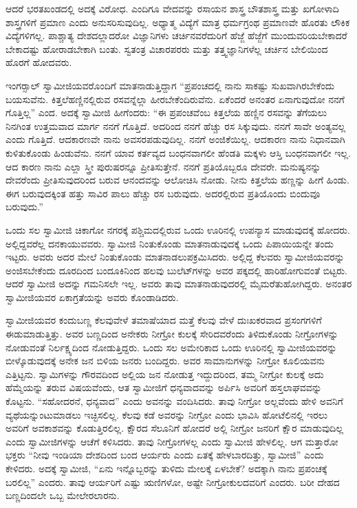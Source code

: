  ಆದರೆ ಭರತಖಂಡದಲ್ಲಿ ಅದಕ್ಕೆ ವಿರೋಧ. ಎಂದಿಗೂ ವೇದವನ್ನು ರಸಾಯನ ಶಾಸ್ತ್ರ ಬೌತಶಾಸ್ತ್ರ ಮತ್ತು ಖಗೋಳಾದಿ ಶಾಸ್ತ್ರಗಳಿಗೆ ಪ್ರಮಾಣ ಎಂದು ಅನುಸರಿಸುವುದಿಲ್ಲ. ಅಧ್ಯಾತ್ಮ ವಿದ್ಯೆಗೆ ಮಾತ್ರ ಧರ್ಮಗ್ರಂಥ ಪ್ರಮಾಣವೇ ಹೊರತು ಲೌಕಿಕ ವಿದ್ಯೆಗಳಿಗಲ್ಲ. ಪಾಶ್ಚಾತ್ಯ ದೇಶದಲ್ಲಾದರೋ ವಿಜ್ಞಾನಿಗಳು ಚರ್ಚಿನವರೆದುರಿಗೆ ಹೆಜ್ಜೆ ಹೆಜ್ಜೆಗೆ ಮುಂದುವರಿಯಬೇಕಾದರೆ ಬೇಕಾದಷ್ಟು ಹೋರಾಡಬೇಕಾಗಿ ಬಂತು. ಸ್ವತಂತ್ರ ವಿಚಾರಪರರು ಮತ್ತು ತತ್ತ್ವಜ್ಞಾನಿಗಳೆಲ್ಲ ಚರ್ಚಿನ ಬೇಲಿಯಿಂದ ಹೊರಗೆ ಹೋದವರು. 

 ಇಂಗರ್‍ಸಾಲ್ ಸ್ವಾಮೀಜಿಯವರೊಂದಿಗೆ ಮಾತನಾಡುತ್ತಿದ್ದಾಗ “ಪ್ರಪಂಚದಲ್ಲಿ ನಾನು ಸಾಕಷ್ಟು ಸುಖವಾಗಿರಬೇಕೆಂದು ಬಯಸುವೆನು. ಕಿತ್ತಲೆಹಣ್ಣಿನಲ್ಲಿರುವ ರಸವನ್ನೆಲ್ಲಾ ಹೀರಬೇಕೆಂದಿರುವೆನು. ಏಕೆಂದರೆ ಅನಂತರ ಏನಾಗುವುದೋ ನನಗೆ ಗೊತ್ತಿಲ್ಲ” ಎಂದ. ಅದಕ್ಕೆ ಸ್ವಾಮೀಜಿ ಹೀಗೆಂದರು: “ಈ ಪ್ರಪಂಚವೆಂಬ ಕಿತ್ತಲೆಯ ಹಣ್ಣಿನ ರಸವನ್ನು ತೆಗೆಯಲು ನಿನಗಿಂತ ಉತ್ತಮವಾದ ಮಾರ್ಗ ನನಗೆ ಗೊತ್ತಿದೆ. ಅದರಿಂದ ನನಗೆ ಹೆಚ್ಚು ರಸ ಸಿಕ್ಕುವುದು. ನನಗೆ ಸಾವೇ ಅಂತ್ಯವಲ್ಲ ಎಂದು ಗೊತ್ತಿದೆ. ಆದಕಾರಣವೇ ನಾನು ಅವಸರಪಡುವುದಿಲ್ಲ. ನನಗೆ ಅಂಜಿಕೆಯಿಲ್ಲ. ಆದಕಾರಣ ನಾನು ನಿಧಾನವಾಗಿ ಕುಳಿತುಕೊಂಡು ಹಿಂಡುವೆನು. ನನಗೆ ಯಾವ ಕರ್ತವ್ಯದ ಬಂಧನವಾಗಲೀ ಹೆಂಡತಿ ಮಕ್ಕಳು ಆಸ್ತಿ ಬಂಧನವಾಗಲೀ ಇಲ್ಲ. ಆದ ಕಾರಣ ನಾನು ಎಲ್ಲಾ ಸ್ತ್ರೀ ಪುರುಷರನ್ನೂ ಪ್ರೀತಿಸುತ್ತೇನೆ. ನನಗೆ ಪ್ರತಿಯೊಬ್ಬರೂ ದೇವರೇ. ಮನುಷ್ಯನನ್ನು ದೇವರೆಂದು ಪ್ರೀತಿಸುವುದರಿಂದ ಬರುವ ಆನಂದವನ್ನು ಆಲೋಚಿಸಿ ನೋಡು. ನೀನು ಕಿತ್ತಲೆಯ ಹಣ್ಣನ್ನು ಹೀಗೆ ಹಿಂಡು. ಈಗ ಬರುವುದಕ್ಕಿಂತ ಹತ್ತು ಸಾವಿರ ಪಾಲು ಹೆಚ್ಚು ರಸ ಬರುವುದು. ಅದರಲ್ಲಿರುವ ಪ್ರತಿಯೊಂದು ಬಿಂದುವೂ ಬರುವುದು.” 

 ಒಂದು ಸಲ ಸ್ವಾಮೀಜಿ ಚಿಕಾಗೋ ನಗರಕ್ಕೆ ಪಶ್ಚಿಮದಲ್ಲಿರುವ ಒಂದು ಊರಿನಲ್ಲಿ ಉಪನ್ಯಾಸ ಮಾಡುವುದಕ್ಕೆ ಹೋದರು. ಅಲ್ಲಿದ್ದವರೆಲ್ಲ ದನಕಾಯುವವರು. ಸ್ವಾಮೀಜಿ ನಿಂತುಕೊಂಡು ಮಾತನಾಡುವುದಕ್ಕೆ ಒಂದು ಪಿಪಾಯಿಯನ್ನೇ ತಂದು ಇಟ್ಟರು. ಅವರು ಅದರ ಮೇಲೆ ನಿಂತುಕೊಂಡು ಮಾತನಾಡಲುಪಕ್ರಮಿಸಿದರು. ಅಲ್ಲಿದ್ದ ಕೆಲವರು ಸ್ವಾಮೀಜಿಯವರನ್ನು ಅಂಜಿಸಬೇಕೆಂದು ದೂರದಿಂದ ಬಂದೂಕಿನಿಂದ ಹಲವು ಬುಲೆಟ್‍ಗಳನ್ನು ಅವರ ಪಕ್ಕದಲ್ಲಿ ಹಾರಿಹೋಗುವಂತೆ ಬಿಟ್ಟರು. ಆದರೆ ಸ್ವಾಮೀಜಿ ಅದನ್ನು ಗಮನಿಸಲೇ ಇಲ್ಲ. ಅವರು ತಾವು ಮಾತನಾಡುವುದರಲ್ಲಿ ಮೈಮರೆತುಹೋಗಿದ್ದರು. ಅನಂತರ ಸ್ವಾಮೀಜಿಯವರ ಏಕಾಗ್ರತೆಯನ್ನು ಅವರು ಕೊಂಡಾಡಿದರು. 

 ಸ್ವಾಮೀಜಿಯವರ ಕಂದುಬಣ್ಣ ಕೆಲವುವೇಳೆ ತಮಾಷೆಯಾದ ಮತ್ತೆ ಕೆಲವು ವೇಳೆ ದುಃಖಕರವಾದ ಪ್ರಸಂಗಗಳಿಗೆ ಈಡುಮಾಡುತ್ತಿತ್ತು. ಅವರ ಬಣ್ಣದಿಂದ ಅನೇಕರು ನೀಗ್ರೋ ಕುಲಕ್ಕೆ ಸೇರಿದವರೆಂದು ತಿಳಿದುಕೊಂಡು ನೀಗ್ರೋಗಳನ್ನು ನೋಡುವಂತೆ ನಿರ್ಲಕ್ಷ್ಯದಿಂದ ನೋಡುತ್ತಿದ್ದರು. ಒಂದು ಸಲ ಅಮೇರಿಕಾದ ಒಂದು ಊರಿನಲ್ಲಿ ಸ್ವಾಮೀಜಿಯವರನ್ನು ಬೀಳ್ಕೊಡುವುದಕ್ಕೆ ಅನೇಕ ಜನ ಬಿಳಿಯ ಜನರು ಬಂದಿದ್ದರು. ಅವರ ಸಾಮಾನುಗಳನ್ನು ನೀಗ್ರೋ ಕೂಲಿಯವನು ಎತ್ತಿಟ್ಟನು. ಸ್ವಾಮಿಗಳನ್ನು ಗೌರವದಿಂದ ಅಲ್ಲಿಯ ಜನ ನೋಡುತ್ತ ಇದ್ದುದರಿಂದ, ತಮ್ಮ ನೀಗ್ರೋ ಕುಲಕ್ಕೆ ಅದು ಹೆಮ್ಮೆಯನ್ನು ತರುವ ವಿಷಯವೆಂದು, ಆತ ಸ್ವಾಮೀಜಿಗೆ ಧನ್ಯವಾದವನ್ನು ಅರ್ಪಿಸಿ ಅವರಿಗೆ ಹಸ್ತಲಾಘವವನ್ನು ಕೊಟ್ಟನು. “ಸಹೋದರನೆ, ಧನ್ಯವಾದ” ಎಂದು ಅವನನ್ನು ವಂದಿಸಿದರು. ತಾವು ನೀಗ್ರೋ ಅಲ್ಲವೆಂದು ಹೇಳಿ ಅವನಿಗೆ ವ್ಯಥೆಯನ್ನುಂಟುಮಾಡಲು ಇಚ್ಛಿಸಲಿಲ್ಲ. ಕೆಲವು ಕಡೆ ಅವರನ್ನು ನೀಗ್ರೋ ಎಂದು ಭಾವಿಸಿ ಹೋಟೆಲಿನಲ್ಲಿ ಇರಲು ಅವರಿಗೆ ಅವಕಾಶವನ್ನು ಕೊಡುತ್ತಿರಲಿಲ್ಲ. ಕ್ಷೌರದ ಸೆಲೂನಿಗೆ ಹೋದರೆ ಅಲ್ಲಿ ನೀಗ್ರೋ‌ ಜನರಿಗೆ ಕ್ಷೌರ ಮಾಡುವುದಿಲ್ಲ ಎಂದು ಸ್ವಾಮೀಜಿಗಳನ್ನು ಆಚೆಗೆ ಕಳಿಸಿದರು. ತಾವು ನೀಗ್ರೋಗಳಲ್ಲ ಎಂದು ಸ್ವಾಮೀಜಿ ಹೇಳಲಿಲ್ಲ. ಆಗ ಮತ್ತಾರೋ ಭಕ್ತರು “ನೀವು ಇಂಡಿಯಾ ದೇಶದಿಂದ ಬಂದ ಆರ್ಯರು ಎಂದು ಏತಕ್ಕೆ ಹೇಳಬಾರದಿತ್ತು, ಸ್ವಾಮೀಜಿ” ಎಂದು ಕೇಳಿದರು. ಅದಕ್ಕೆ ಸ್ವಾಮೀಜಿ,‌‌ “ಏನು ಇನ್ನೊಬ್ಬರನ್ನು ತುಳಿದು ಮೇಲಕ್ಕೆ ಏಳಬೇಕೆ? ಅದಕ್ಕಾಗಿ ನಾನು ಪ್ರಪಂಚಕ್ಕೆ ಬರಲಿಲ್ಲ‌” ಎಂದರು. ತಾವು ಆರ್ಯರಿಗೆ ಎಷ್ಟು ಋಣಿಗಳೋ, ಅಷ್ಟೇ ನೀಗ್ರೋಕುಲದವರಿಗೆ ಎಂದರು. ಬರೀ ದೇಹದ ಬಣ್ಣದಿಂದಲೇ ಒಬ್ಬ ಮೇಲೇರಲಾರನು. 

